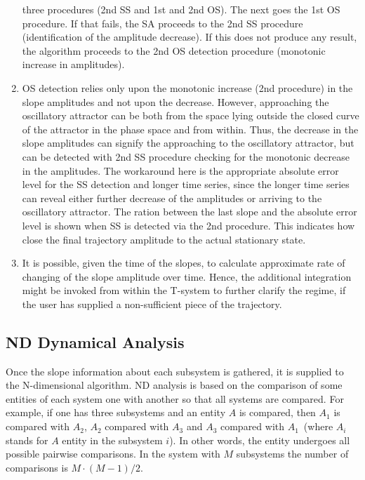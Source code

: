\documentclass[11pt,a4paper]{article}
\begin{document}
\begin{enumerate}
  three procedures (2nd SS and 1st and 2nd OS). The next goes the 1st OS
  procedure. If that fails, the SA proceeds to the 2nd SS procedure (identification
  of the amplitude decrease). If this does not produce any result, the algorithm
  proceeds to the 2nd OS detection procedure (monotonic increase in amplitudes).
\item OS detection relies only upon the monotonic increase (2nd procedure) in the
  slope amplitudes and not upon the decrease. However, approaching the oscillatory
  attractor can be both from the space lying outside the closed curve of the
  attractor in the phase space and from within. Thus, the decrease in the slope
  amplitudes can signify the approaching to the oscillatory attractor, but can be
  detected with 2nd SS procedure checking for the monotonic decrease in the
  amplitudes. The workaround here is the appropriate absolute error level for the SS
  detection and longer time series, since the longer time series can reveal either
  further decrease of the amplitudes or arriving to the oscillatory attractor. The
  ration between the last slope and the absolute error level is shown when SS is
  detected via the 2nd procedure. This indicates how close the final trajectory
  amplitude to the actual stationary state.
\item It is possible, given the time of the slopes, to calculate approximate rate of
  changing of the slope amplitude over time. Hence, the additional integration might
  be invoked from within the T-system to further clarify the regime, if the user has
  supplied a non-sufficient piece of the trajectory.
\end{enumerate}

\subsection{ND Dynamical Analysis}
\label{sec:nd-dynamics-analysis}

Once the slope information about each subsystem is gathered, it is supplied to the
N-dimensional algorithm. ND analysis is based on the comparison of some entities of
each system one with another so that all systems are compared. For example, if one
has three subsystems and an entity $A$ is compared, then $A_1$ is compared with
$A_2$, $A_2$ compared with $A_3$ and $A_3$ compared with $A_1$~(where $A_i$ stands
for $A$ entity in the subsystem $i$). In other words, the entity undergoes all
possible pairwise comparisons. In the system with $M$ subsystems the number of
comparisons is $M\cdot(M-1)/2$.
\end{document}
